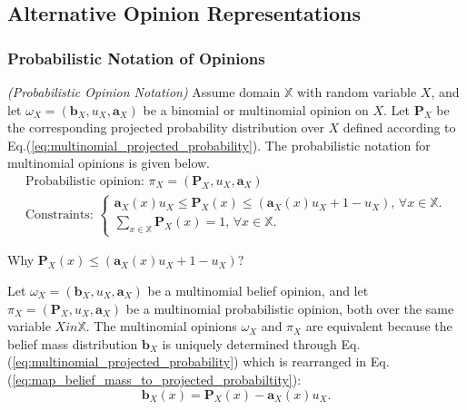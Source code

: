 \subsection{Alternative Opinion Representations}

\subsubsection{Probabilistic Notation of Opinions}

\begin{definition}
    \emph{(Probabilistic Opinion Notation)} Assume domain $\mathbb{X}$ with random variable $X$, and let $\omega_X = (\mathbf{b}_X, u_X, \mathbf{a}_X)$ be a binomial or multinomial opinion on $X$. Let $\mathbf{P}_X$ be the corresponding projected probability distribution over $X$ defined according to Eq.(\ref{eq:multinomial_projected_probability}). The probabilistic notation for multinomial opinions is given
below.
    \begin{equation}
        \begin{array}{l}
        \text{Probabilistic opinion: } \pi_X = (\mathbf{P}_X, u_X, \mathbf{a}_X) \\
        \text{Constraints: } \begin{cases}
        \mathbf{a}_X(x) u_X \leq \mathbf{P}_X(x) \leq (\mathbf{a}_X(x) u_X + 1 - u_X)\text{, } \forall x \in \mathbb{X}.\\
        \sum\limits_{x \in \mathbb{X}} \mathbf{P}_X(x) = 1\text{, } \forall x \in \mathbb{X}.
        \end{cases}
        \end{array}
    \end{equation}
\end{definition}

\begin{question}
    Why $\mathbf{P}_X(x) \leq (\mathbf{a}_X(x) u_X + 1 - u_X)$?
\end{question}

\begin{definition}
    Let $\omega_X = (\mathbf{b}_X, u_X, \mathbf{a}_X)$ be a multinomial belief opinion, and let $\pi_X = (\mathbf{P}_X, u_X, \mathbf{a}_X)$ be a multinomial probabilistic opinion, both over the same variable $X in \mathbb{X}$. The
multinomial opinions $\omega_X$ and $\pi_X$ are equivalent because the belief mass distribution
$\mathbf{b}_X$ is uniquely determined through Eq.(\ref{eq:multinomial_projected_probability}) which is rearranged in Eq.(\ref{eq:map_belief_mass_to_projected_probabiltity}):
    \begin{equation}\label{eq:map_belief_mass_to_projected_probabiltity}
        \mathbf{b}_X(x) = \mathbf{P}_X(x) - \mathbf{a}_X(x) u_X\text{.}
    \end{equation}
\end{definition}

